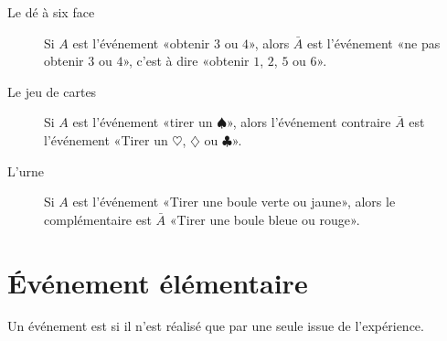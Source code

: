 \begin{example}
    \begin{description}
        \item[Le dé à six face] Si \( A\) est l'événement «obtenir \( 3\) ou \( 4\)», alors \( \bar A\) est l'événement «ne pas obtenir \( 3\) ou \( 4\)», c'est à dire «obtenir \( 1\), \( 2\), \( 5\) ou \( 6\)».
        \item[Le jeu de cartes] Si \( A\) est l'événement «tirer un \( \spadesuit\)», alors l'événement contraire \( \bar A\) est l'événement «Tirer un \( \heartsuit\), \( \diamondsuit\) ou \( \clubsuit\)».
        \item[L'urne] Si \( A\) est l'événement «Tirer une boule verte ou jaune», alors le complémentaire est \( \bar A\) «Tirer une boule bleue ou rouge».
    \end{description}
\end{example}

\section{Événement élémentaire}

\begin{definition}
    Un événement est  si il n'est réalisé que par une seule issue de l'expérience.
\end{definition}

